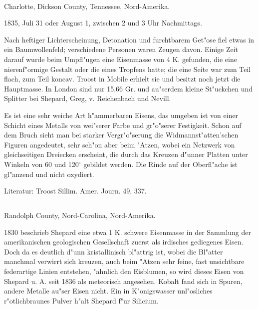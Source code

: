 \documentclass[a4paper, 11pt, oneside]{article}
\begin{document}
\paragraph{}
Charlotte, Dickson County, Tennessee, Nord-Amerika.

1835, Juli 31 oder August 1, zwischen 2 und 3 Uhr Nachmittags.

Nach heftiger Lichterscheinung, Detonation und furchtbarem Get"ose fiel etwas in ein Baumwollenfeld; verschiedene Personen waren Zeugen davon. Einige Zeit darauf wurde beim Umpfl"ugen eine Eisenmasse von 4 K. gefunden, die eine nierenf"ormige Gestalt oder die eines Tropfens hatte; die eine Seite war zum Teil flach, zum Teil koncav. Troost in Mobile erhielt sie und besitzt noch jetzt die Hauptmasse. In London sind nur 15,66 Gr. und au"serdem kleine St"uckchen und Splitter bei Shepard, Greg, v. Reichenbach und Nevill.

Es ist eine sehr weiche Art h"ammerbaren Eisens, das umgeben ist von einer Schicht eines Metalls von wei"serer Farbe und gr"o"serer Festigkeit. Schon auf dem Bruch sieht man bei starker Vergr"o"serung die Widmannst"atten'schen Figuren angedeutet, sehr sch"on aber beim "Atzen, wobei ein Netzwerk von gleichseitigen Dreiecken erscheint, die durch das Kreuzen d"unner Platten unter Winkeln von 60 und 120$^\circ$ gebildet werden. Die Rinde auf der Oberfl"ache ist gl"anzend und nicht oxydiert.

\normalsize
Literatur: Troost Sillim. Amer. Journ. 49, 337.

\subsection{}
\LARGE
\paragraph{}
Randolph County, Nord-Carolina, Nord-Amerika.

1830 beschrieb Shepard eine etwa 1 K. schwere Eisenmasse in der Sammlung der amerikanischen geologischen Gesellschaft zuerst als irdisches gediegenes Eisen. Doch da es deutlich d"unn kristallinisch bl"attrig ist, wobei die Bl"atter manchmal verwirrt sich kreuzen, auch beim "Atzen sehr feine, fast unsichtbare federartige Linien entstehen, "ahnlich den Eisblumen, so wird dieses Eisen von Shepard u. A. seit 1836 als meteorisch angesehen. Kobalt fand sich in Spuren, andere Metalle au"ser Eisen nicht. Ein in K"onigswasser unl"osliches r"otlichbraunes Pulver h"alt Shepard f"ur Silicium.
\end{document}
